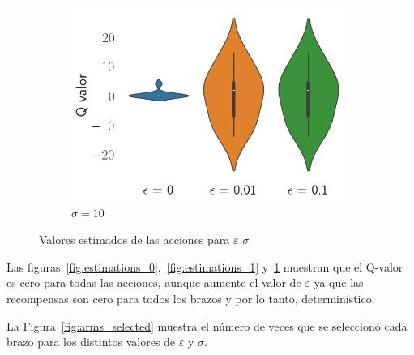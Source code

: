 \documentclass[12pt]{article}
\begin{document}
\begin{figure}[h]
\begin{subfigure}[H]{0.3\textwidth}
            \includegraphics[width=\textwidth]{../img/values_sigma_10}
            \caption{$\sigma=10$}
            \label{fig:estimations_2}
        \end{subfigure}

        \caption{Valores estimados de las acciones para $\varepsilon$ $\sigma$}
        \label{fig:estimations}
    \end{figure}

    Las figuras~\ref{fig:estimations_0},~\ref{fig:estimations_1} y~\ref{fig:estimations_2} muestran que el Q-valor es cero para todas las acciones, aunque aumente el valor de $\varepsilon$ ya que las recompensas son cero para todos los brazos y por lo tanto, determinístico.

    La Figura~\ref{fig:arms_selected} muestra el número de veces que se seleccionó cada brazo para los distintos valores de $\varepsilon$ y $\sigma$.
\end{document}
